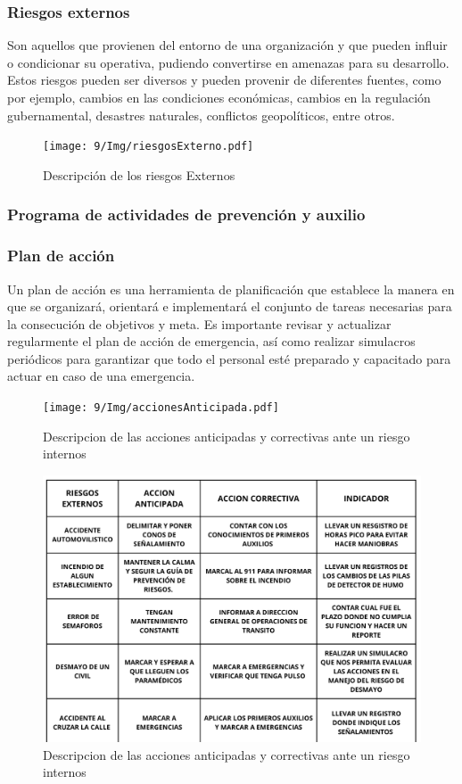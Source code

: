     \subsubsection{Riesgos externos}
    Son  aquellos que provienen del entorno de una organización y que pueden influir o condicionar su operativa, pudiendo convertirse en amenazas para su desarrollo.\cite{H} 
    Estos riesgos pueden ser diversos y pueden provenir de diferentes fuentes, como por ejemplo, cambios en las condiciones económicas, cambios en la regulación gubernamental, desastres naturales, conflictos geopolíticos, entre otros.
    \begin{figure}[H]
        \centering
        \texttt{[image: 9/Img/riesgosExterno.pdf]}
        \caption{Descripción de los riesgos Externos}
        \label{fig:mapa-itq}
    \end{figure}
    \subsubsection{Programa de actividades de prevención y auxilio}
    \subsubsection{Plan de acción}
    Un plan de acción es una herramienta de planificación que establece la manera en que se organizará, orientará e implementará el conjunto de tareas necesarias para la consecución de objetivos y meta.\cite{NR}
    Es importante revisar y actualizar regularmente el plan de acción de emergencia, así como realizar simulacros periódicos para garantizar que todo el personal esté preparado y capacitado para actuar en caso de una emergencia.
    \begin{figure}[H]
        \centering
        \texttt{[image: 9/Img/accionesAnticipada.pdf]}
        \caption{Descripcion de las acciones anticipadas y correctivas ante un riesgo internos}
        \label{fig:mapa-itq}
    \end{figure}
    
    \begin{figure}[H]
        \centering
        \includegraphics[scale=0.1]{9/Img/accionesAnticipadas.pdf}
        \caption{Descripcion de las acciones anticipadas y correctivas ante un riesgo internos}
        \label{fig:mapa-itq}
    \end{figure}
